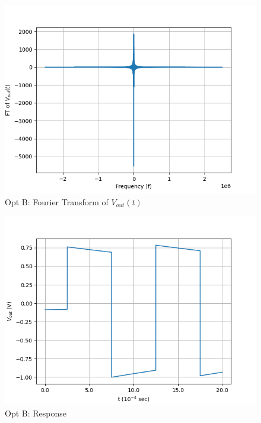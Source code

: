 \documentclass[journal,12pt,twocolumn]{IEEEtran}
\theoremstyle{remark}
\begin{document}
\begin{figure}[!h]
    \centering
    \includegraphics[width = \columnwidth]{figs/opt_b_ft.png}
    \caption{Opt B: Fourier Transform of $V_{out}(t)$}
    \label{fig:b_ft_gate.ph.23.37}
\end{figure}
\begin{figure}[!h]
    \centering
    \includegraphics[width = \columnwidth]{figs/opt_b_res.png}
    \caption{Opt B: Response}
    \label{fig:b_res_gate.ph.23.37}
\end{figure}
\end{document}
